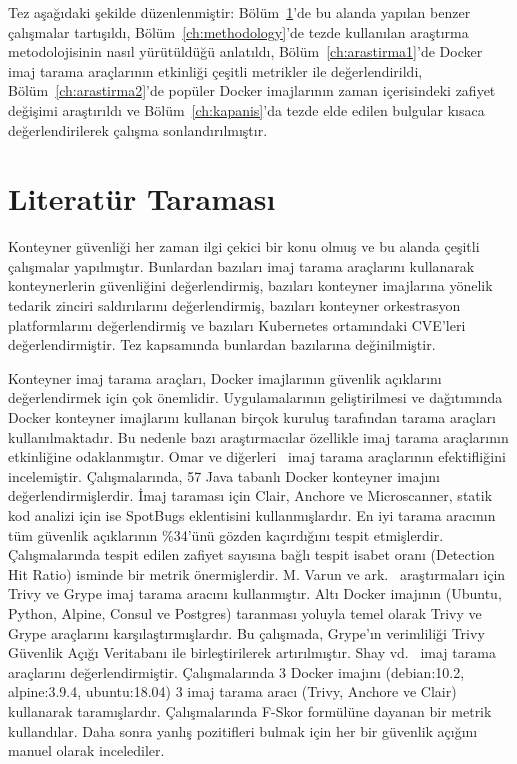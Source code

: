 
Tez aşağıdaki şekilde düzenlenmiştir: Bölüm~\ref{ch:literatur}'de bu alanda yapılan benzer çalışmalar tartışıldı, Bölüm~\ref{ch:methodology}'de tezde kullanılan araştırma metodolojisinin nasıl yürütüldüğü anlatıldı, Bölüm~\ref{ch:arastirma1}'de Docker imaj tarama araçlarının etkinliği çeşitli metrikler ile değerlendirildi, Bölüm~\ref{ch:arastirma2}'de popüler Docker imajlarının zaman içerisindeki zafiyet değişimi araştırıldı ve Bölüm~\ref{ch:kapanis}'da tezde elde edilen bulgular kısaca değerlendirilerek çalışma sonlandırılmıştır.

\chapter{Literatür Taraması}\label{ch:literatur}
\vspace{12pt}

Konteyner güvenliği her zaman ilgi çekici bir konu olmuş ve bu alanda çeşitli çalışmalar yapılmıştır. Bunlardan bazıları imaj tarama araçlarını kullanarak konteynerlerin güvenliğini değerlendirmiş, bazıları konteyner imajlarına yönelik tedarik zinciri saldırılarını değerlendirmiş, bazıları konteyner orkestrasyon platformlarını değerlendirmiş ve bazıları Kubernetes ortamındaki CVE'leri değerlendirmiştir. Tez kapsamında bunlardan bazılarına değinilmiştir.

Konteyner imaj tarama araçları, Docker imajlarının güvenlik açıklarını değerlendirmek için çok önemlidir. Uygulamalarının geliştirilmesi ve dağıtımında Docker konteyner imajlarını kullanan birçok kuruluş tarafından tarama araçları kullanılmaktadır. Bu nedenle bazı araştırmacılar özellikle imaj tarama araçlarının etkinliğine odaklanmıştır. Omar ve diğerleri~\autocite{Javed2021} imaj tarama araçlarının efektifliğini incelemiştir. Çalışmalarında, 57 Java tabanlı Docker konteyner imajını değerlendirmişlerdir. İmaj taraması için Clair, Anchore ve Microscanner, statik kod analizi için ise SpotBugs eklentisini kullanmışlardır. En iyi tarama aracının tüm güvenlik açıklarının \%34'ünü gözden kaçırdığını tespit etmişlerdir. Çalışmalarında tespit edilen zafiyet sayısına bağlı tespit isabet oranı (Detection Hit Ratio) isminde bir metrik önermişlerdir. M. Varun ve ark.~\autocite{Varun2023} araştırmaları için Trivy ve Grype imaj tarama aracını kullanmıştır. Altı Docker imajının (Ubuntu, Python, Alpine, Consul ve Postgres) taranması yoluyla temel olarak Trivy ve Grype araçlarını karşılaştırmışlardır. Bu çalışmada, Grype'ın verimliliği Trivy Güvenlik Açığı Veritabanı ile birleştirilerek artırılmıştır. Shay vd.~\autocite{UBCIS} imaj tarama araçlarını değerlendirmiştir. Çalışmalarında 3 Docker imajını (debian:10.2, alpine:3.9.4, ubuntu:18.04) 3 imaj tarama aracı (Trivy, Anchore ve Clair) kullanarak taramışlardır. Çalışmalarında F-Skor formülüne dayanan bir metrik kullandılar. Daha sonra yanlış pozitifleri bulmak için her bir güvenlik açığını manuel olarak incelediler.

